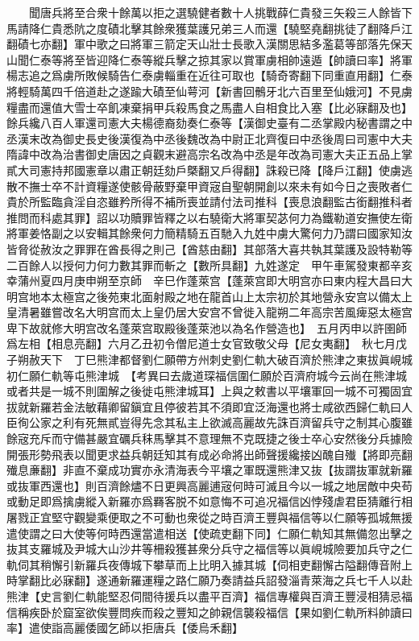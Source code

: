 　　聞唐兵將至合衆十餘萬以拒之選驍健者數十人挑戰薛仁貴發三矢殺三人餘皆下馬請降仁貴悉阬之度磧北擊其餘衆獲葉護兄弟三人而還【驍堅堯翻挑徒了翻降戶江翻磧七亦翻】軍中歌之曰將軍三箭定天山壯士長歌入漢關思結多濫葛等部落先保天山聞仁泰等將至皆迎降仁泰等縱兵擊之掠其家以賞軍虜相帥遠遁【帥讀曰率】將軍楊志追之爲虜所敗候騎告仁泰虜輜重在近往可取也【騎奇寄翻下同重直用翻】仁泰將輕騎萬四千倍道赴之遂踰大磧至仙萼河【新書回鶻牙北六百里至仙娥河】不見虜糧盡而還值大雪士卒飢凍棄捐甲兵殺馬食之馬盡人自相食比入塞【比必寐翻及也】餘兵纔八百人軍還司憲大夫楊德裔劾奏仁泰等【漢御史臺有二丞掌殿内秘書謂之中丞漢末改為御史長史後漢復為中丞後魏改為中尉正北齊復曰中丞後周曰司憲中大夫隋諱中改為治書御史唐因之貞觀末避高宗名改為中丞是年改為司憲大夫正五品上掌貳大司憲持邦國憲章以肅正朝廷劾戶槩翻又戶得翻】誅殺已降【降戶江翻】使虜逃散不撫士卒不計資糧遂使骸骨蔽野棄甲資宼自聖朝開創以來未有如今日之喪敗者仁貴於所監臨貪淫自恣雖矜所得不補所喪並請付法司推科【喪息浪翻監古銜翻推科者推問而科處其罪】詔以功贖罪皆釋之以右驍衛大將軍契苾何力為鐵勒道安撫使左衛將軍姜恪副之以安輯其餘衆何力簡精騎五百馳入九姓中虜大驚何力乃謂曰國家知汝皆脅從赦汝之罪罪在酋長得之則己【酋慈由翻】其部落大喜共執其葉護及設特勒等二百餘人以授何力何力數其罪而斬之【數所具翻】九姓遂定　甲午車駕發東都辛亥幸蒲州夏四月庚申朔至京師　辛巳作蓬萊宫【蓬萊宫即大明宫亦曰東内程大昌曰大明宫地本太極宫之後苑東北面射殿之地在龍首山上太宗初於其地營永安宫以備太上皇清暑雖嘗改名大明宫而太上皇仍居大安宫不曾徙入龍朔二年高宗苦風痺惡太極宫卑下故就修大明宫改名蓬萊宫取殿後蓬萊池以為名作營造也】　五月丙申以許圉師爲左相【相息亮翻】六月乙丑初令僧尼道士女官致敬父母【尼女夷翻】　秋七月戊子朔赦天下　丁巳熊津都督劉仁願帶方州刺史劉仁軌大破百濟於熊津之東拔眞峴城初仁願仁軌等屯熊津城　【考異曰去歲道琛福信圍仁願於百濟府城今云尚在熊津城或者共是一城不則圍解之後徙屯熊津城耳】上與之敕書以平壤軍回一城不可獨固宜拔就新羅若金法敏藉卿留鎭宜且停彼若其不須即宜泛海還也將士咸欲西歸仁軌曰人臣徇公家之利有死無貳豈得先念其私主上欲滅高麗故先誅百濟留兵守之制其心腹雖餘宼充斥而守備甚嚴宜礪兵秣馬擊其不意理無不克既捷之後士卒心安然後分兵據險開張形勢飛表以聞更求益兵朝廷知其有成必命將出師聲援纔接凶醜自殱【將即亮翻殱息亷翻】非直不棄成功實亦永清海表今平壤之軍既還熊津又抜【抜謂抜軍就新羅或抜軍西還也】則百濟餘燼不日更興高麗逋宼何時可滅且今以一城之地居敵中央苟或動足即爲擒虜縱入新羅亦爲羇客脱不如意悔不可追况福信凶悖殘虐君臣猜離行相屠戮正宜堅守觀變乘便取之不可動也衆從之時百濟王豐與福信等以仁願等孤城無援遣使謂之曰大使等何時西還當遣相送【使疏吏翻下同】仁願仁軌知其無備忽出擊之抜其支羅城及尹城大山沙井等柵殺獲甚衆分兵守之福信等以眞峴城險要加兵守之仁軌伺其稍懈引新羅兵夜傳城下攀草而上比明入據其城【伺相吏翻懈古隘翻傳音附上時掌翻比必寐翻】遂通新羅運糧之路仁願乃奏請益兵詔發淄青萊海之兵七千人以赴熊津【史言劉仁軌能堅忍伺間待援兵以盡平百濟】福信專權與百濟王豐浸相猜忌福信稱疾卧於窟室欲俟豐問疾而殺之豐知之帥親信襲殺福信【果如劉仁軌所料帥讀曰率】遣使詣高麗倭國乞師以拒唐兵【倭烏禾翻】

